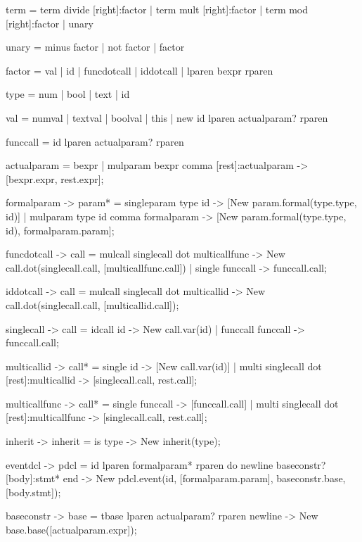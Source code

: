     term        =   term divide [right]:factor  
                |   term mult [right]:factor  
                |   term mod [right]:factor  
                |   unary               

    unary       =   minus factor 
                |   not factor
                |   factor  

    factor      =   val
                |   id
                |   funcdotcall
                |   iddotcall
                |   lparen bexpr rparen

    type        =   num  
                |   bool     
                |   text                        
                |   id   

    val         =   numval
                |   textval
                |   boolval
                |   this
                |   new id lparen actualparam? rparen

    funccall    =   id lparen actualparam? rparen


    actualparam =   bexpr
                |   {mulparam} bexpr comma [rest]:actualparam               {-> [bexpr.expr, rest.expr]};

    formalparam {-> param*}  =   {singleparam} type id                                  {-> [New param.formal(type.type, id)]}
                            |   {mulparam} type id comma formalparam                    {-> [New param.formal(type.type, id), formalparam.param]};

    funcdotcall {-> call}   =   {mulcall} singlecall dot multicallfunc                  {-> New call.dot(singlecall.call, [multicallfunc.call])}
                            |   {single} funccall                                       {-> funccall.call};

    iddotcall {-> call}     =   {mulcall} singlecall dot multicallid                    {-> New call.dot(singlecall.call, [multicallid.call])};

    singlecall  {-> call}   =   {idcall} id                                             {-> New call.var(id)}
                            |   {funccall} funccall                                     {-> funccall.call};

    multicallid {-> call*}  =   {single} id                                             {-> [New call.var(id)]}
                            |   {multi} singlecall dot [rest]:multicallid                 {-> [singlecall.call, rest.call]};

    multicallfunc   {-> call*}  =   {single} funccall                                   {-> [funccall.call]}
                                |   {multi} singlecall dot [rest]:multicallfunc             {-> [singlecall.call, rest.call]};


    inherit     {-> inherit}    =    is type                                            {-> New inherit(type)};

    eventdcl    {-> pdcl}   =   id lparen formalparam* rparen do newline baseconstr? [body]:stmt* end          {-> New pdcl.event(id, [formalparam.param], baseconstr.base, [body.stmt])};

    baseconstr  {-> base}   =   tbase lparen actualparam? rparen newline                {-> New base.base([actualparam.expr])};